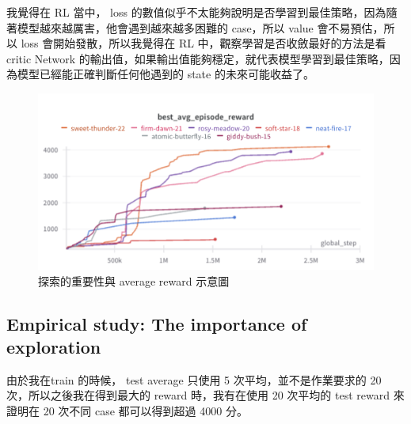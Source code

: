 我覺得在 RL 當中， loss 的數值似乎不太能夠說明是否學習到最佳策略，因為隨著模型越來越厲害，他會遇到越來越多困難的 case，所以 value 會不易預估，所以 loss 會開始發散，所以我覺得在 RL 中，觀察學習是否收斂最好的方法是看 critic Network 的輸出值，如果輸出值能夠穩定，就代表模型學習到最佳策略，因為模型已經能正確判斷任何他遇到的 state 的未來可能收益了。

\begin{figure}[h]
    \centering
    \includegraphics[width=\textwidth]{figures/The importance of exploration.png}
    \caption{探索的重要性與 average reward 示意圖}
    \label{fig:exploration_importance_and_value}
\end{figure}

\clearpage
\subsection{Empirical study: The importance of exploration}

由於我在train 的時候， test average 只使用 5 次平均，並不是作業要求的 20 次，所以之後我在得到最大的 reward 時，我有在使用 20 次平均的 test reward 來證明在 20 次不同 case 都可以得到超過 4000 分。


